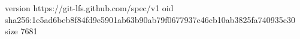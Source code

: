 version https://git-lfs.github.com/spec/v1
oid sha256:1e5ad6beb8f84fd9e5901ab63b90ab79f0677937c46cb10ab3825fa740935c30
size 7681
